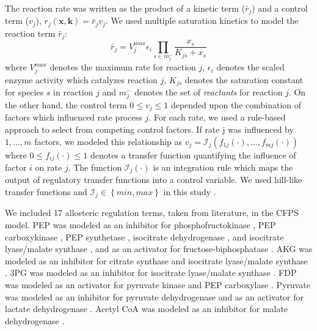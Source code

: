 \documentclass[12pt]{article}
\begin{document}
The reaction rate was written as the product of a kinetic term ($\bar{r}_{j}$) and a control term ($v_{j}$), $r_{j}\left(\mathbf{x},\mathbf{k}\right)=\bar{r}_{j}v_{j}$.
We used multiple saturation kinetics to model the reaction term $\bar{r}_{j}$:
\begin{equation}\label{eqn:rate-bar}
	\bar{r}_{j}=V_{j}^{max}\epsilon_{i}\prod_{s\in{m_{j}^{-}}}\frac{x_{s}}{K_{js} + x_{s}}
\end{equation}
where $V_{j}^{max}$ denotes the maximum rate for reaction $j$, $\epsilon_{i}$ denotes the scaled enzyme activity which catalyzes reaction $j$,
$K_{js}$ denotes the saturation constant for species $s$ in reaction $j$ and $m_{j}^{-}$ denotes the set of \textit{reactants} for reaction $j$.
On the other hand, the control term $0\leq v_{j}\leq 1$ depended upon the combination of factors which influenced rate process $j$.
For each rate, we used a rule-based approach to select from competing control factors.
If rate j was influenced by $1,\dots,m$ factors, we modeled this relationship as
$v_{j}=\mathcal{I}_{j}\left(f_{1j}\left(\cdot\right),\hdots,f_{mj}\left(\cdot\right)\right)$
where $0\leq f_{ij}\left(\cdot\right)\leq 1$ denotes a transfer function quantifying the influence of factor $i$ on rate $j$.
The function $\mathcal{I}_{j}\left(\cdot\right)$ is an integration rule which maps the output of regulatory transfer functions into a control
variable. We used hill-like transfer functions and $\mathcal{I}_{j}\in\left\{min,max\right\}$ in this study \cite{pr3010138}.

We included 17 allosteric regulation terms, taken from literature, in the CFPS model.
PEP was modeled as an inhibitor for phosphofructokinase \cite{2010_kotte_MolSystBiol,2011_cabrera_JBiolChem}, PEP carboxykinase \cite{2010_kotte_MolSystBiol}, PEP synthetase \cite{2010_kotte_MolSystBiol,1973_chulavatnatol_JBiolChem}, isocitrate dehydrogenase \cite{2010_kotte_MolSystBiol,2007_ogawa_JBacteriol}, and isocitrate lyase\slash malate synthase \cite{2010_kotte_MolSystBiol,2007_ogawa_JBacteriol,1988_mackintosh_BiochemJ}, and as an activator for fructose-biphosphatase \cite{2010_kotte_MolSystBiol,2000_donahue_JBacteriol,2006_hines_JBiolChem,2007_hines_JBiolChem}.
AKG was modeled as an inhibitor for citrate synthase \cite{2010_kotte_MolSystBiol,1994_pereira_JBiolChem,1983_robinson_FEBSLett} and isocitrate lyase\slash malate synthase \cite{2010_kotte_MolSystBiol,1988_mackintosh_BiochemJ}.
3PG was modeled as an inhibitor for isocitrate lyase\slash malate synthase \cite{2010_kotte_MolSystBiol,1988_mackintosh_BiochemJ}.
FDP was modeled as an activator for pyruvate kinase \cite{2010_kotte_MolSystBiol,2010_zhu_Biochimie} and PEP carboxylase \cite{2010_kotte_MolSystBiol,1972_wohl_JBiolChem}.
Pyruvate was modeled as an inhibitor for pyruvate dehydrogenase \cite{2010_kotte_MolSystBiol,2007_kale_JBiolChem,2002_arjunan_Biochemistry} and as an activator for lactate dehydrogenase \cite{2008_okino_ApplMicrobiolBiotechnol}.
Acetyl CoA was modeled as an inhibitor for malate dehydrogenase \cite{2010_kotte_MolSystBiol}.
\end{document}
